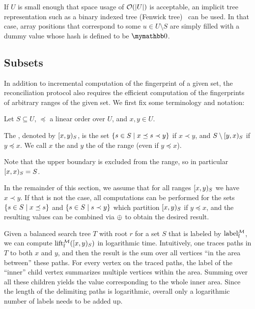 If $U$ is small enough that space usage of $\mathcal{O}(|{U}|)$ is acceptable, an implicit tree representation such as a binary indexed tree (Fenwick tree)~\cite{fenwick1994new} can be used. In that case, array positions that correspond to some $u \in U \setminus S$ are simply filled with a dummy value whose hash is defined to be $\neutraladd$.

\subsection{Subsets}
\label{subsets-associative}

In addition to incremental computation of the fingerprint of a given set, the reconciliation protocol also requires the efficient computation of the fingerprints of arbitrary ranges of the given set. We first fix some terminology and notation:

\begin{definition}
\label{def-range}
Let $S \subseteq U$, $\preceq$ a linear order over $U$, and $x, y \in U$.

The , denoted by $[{x},{y})_{S}$, is the set $\{s \in S \mid x \preceq s \prec y\}$ if $x \prec y$, and $S \setminus [{y},{x})_{S}$ if $y \preceq x$. We call $x$ the  and $y$ the  of the range (even if $y \preceq x$).

Note that the upper boundary is excluded from the range, so in particular $[{x},{x})_{S} = S$.
\end{definition}

In the remainder of this section, we assume that for all ranges $[{x},{y})_{S}$ we have $x \prec y$. If that is not the case, all computations can be performed for the sets $\{s \in S \mid x \preceq s\}$ and $\{s \in S \mid s \prec y\}$ which partition $[{x},{y})_{S}$ if $y \preceq x$, and the resulting values can be combined via $\oplus$ to obtain the desired result.

Given a balanced search tree $T$ with root $r$ for a set $S$ that is labeled by $\operatorname{label_{\operatorname{f}}^{\mathcal{M}}}$, we can compute $\operatorname{lift_{\operatorname{f}}^{\mathcal{M}}}([{x},{y})_{S})$ in logarithmic time. Intuitively, one traces paths in $T$ to both $x$ and $y$, and then the result is the sum over all vertices ``in the area between'' these paths. For every vertex on the traced paths, the label of the ``inner'' child vertex summarizes multiple vertices within the area. Summing over all these children yields the value corresponding to the whole inner area. Since the length of the delimiting paths is logarithmic, overall only a logarithmic number of labels needs to be added up.

